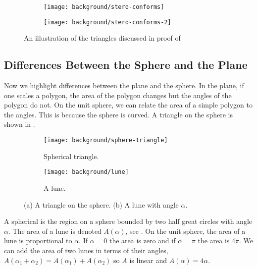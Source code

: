  \begin{figure}[htb]
         \centering
        \begin{subfigure}[b]{0.4\textwidth}
         \texttt{[image: background/stero-conforms]}
         \caption{}
 	 \label{fig:conforms}
       \end{subfigure}
         \hspace{1cm}
         \begin{subfigure}[b]{0.3\textwidth}
         \texttt{[image: background/stero-conforms-2]}
         \caption{}
          \label{fig:project-tangent}
         \end{subfigure}
		\caption{An illustration of the triangles discussed in proof of 
 		\label{fig:conformal}}
 \end{figure}


	
\subsection{Differences Between the Sphere and the Plane}

Now we highlight differences between the plane and the sphere.
In the plane, if one scales a polygon, the area of the polygon changes
but the angles of the polygon do not.
On the unit sphere, we can relate the area of a simple polygon 
to the angles. This is because the sphere is curved.
A triangle on the sphere is shown in .


 \begin{figure}[htb]
         \centering
        \begin{subfigure}[b]{0.35\textwidth}
         \texttt{[image: background/sphere-triangle]}
         \caption{Spherical triangle.}
 	 \label{fig:sphere-triangle}
       \end{subfigure}
         \hspace{1cm}
         \begin{subfigure}[b]{0.35\textwidth}
         \texttt{[image: background/lune]}
         \caption{A lune.}
          \label{fig:lune}
         \end{subfigure}
		\caption{(a) A triangle on the sphere.
 		(b) A lune with angle $\alpha$.
 		\label{fig:sphere-lune}}
 \end{figure}
A spherical  is the region on a sphere bounded by two half great circles
with angle $\alpha$. The area of a lune is denoted $A(\alpha)$,
 see .
On the unit sphere, the area of a lune is proportional to $\alpha$. 
If $\alpha=0$ the area is zero and if $\alpha=\pi$ the area is $4\pi$.
We can add the area of two lunes in terms of their angles, 
$A(\alpha_1+\alpha_2)=A(\alpha_1)+A(\alpha_2)$ so $A$ is linear
and  $A(\alpha)=4\alpha.$




